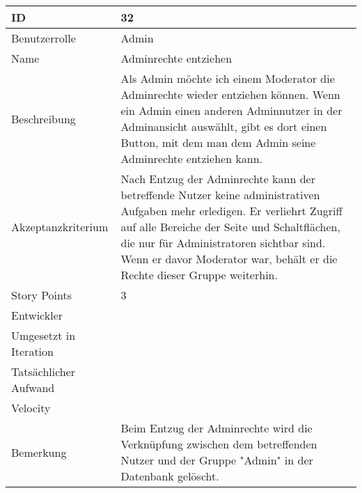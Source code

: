 \begin{tabularx}{\textwidth}{|p{}|X|}
	\hline
	ID & 32 \\
	\hline
	Benutzerrolle & Admin \\
	\hline
	Name & Adminrechte entziehen\\
	\hline
	Beschreibung & Als Admin möchte ich einem Moderator die Adminrechte wieder entziehen können. Wenn ein Admin einen anderen Adminnutzer in der Adminansicht auswählt, gibt es dort einen Button, mit dem man dem Admin seine Adminrechte entziehen kann.  \\
	\hline
	Akzeptanzkriterium & Nach Entzug der Adminrechte kann der betreffende Nutzer keine administrativen Aufgaben mehr erledigen. Er verliehrt Zugriff auf alle Bereiche der Seite und Schaltflächen, die nur für Administratoren sichtbar sind. Wenn er davor Moderator war, behält er die Rechte dieser Gruppe weiterhin. \\
	\hline
	Story Points & 3 \\
	\hline
	Entwickler &  \\
	\hline
	Umgesetzt in Iteration & \\
	\hline
	Tatsächlicher Aufwand & \\
	\hline
	Velocity & \\
	\hline
	Bemerkung & Beim Entzug der Adminrechte wird die Verknüpfung zwischen dem betreffenden Nutzer und der Gruppe "Admin" in der Datenbank gelöscht.\\
	\hline
\end{tabularx}
\vspace{20pt}
